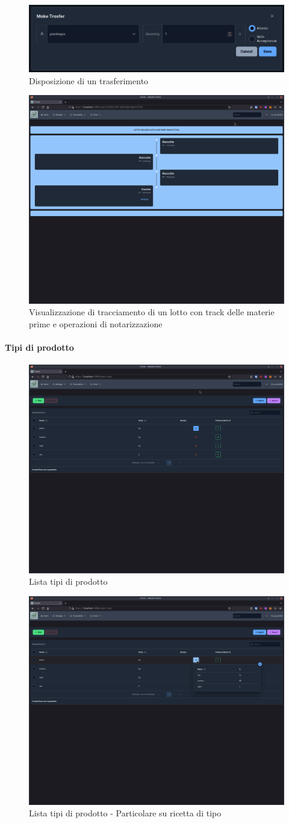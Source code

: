 \documentclass[a4paper,11pt]{article}
\begin{document}
\begin{figure}[H]
  \centering
  \includegraphics[width=0.5\linewidth]{screenIotChain/0006.png}
  \caption{Disposizione di un trasferimento}
  \label{fig:screen6}
\end{figure}

\begin{figure}[H]
  \centering
  \includegraphics[width=0.5\linewidth]{screenIotChain/0014.png}
  \caption{Visualizzazione di tracciamento di un lotto con track delle materie prime e operazioni di notarizzazione}
  \label{fig:screen14}
\end{figure}

\paragraph{Tipi di prodotto}


\begin{figure}[H]
  \centering
  \includegraphics[width=0.5\linewidth]{screenIotChain/0007.png}
  \caption{Lista tipi di prodotto}
  \label{fig:screen7}
\end{figure}

\begin{figure}[H]
  \centering
  \includegraphics[width=0.5\linewidth]{screenIotChain/0008.png}
  \caption{Lista tipi di prodotto - Particolare su ricetta di tipo}
  \label{fig:screen8}
\end{figure}
\end{document}
